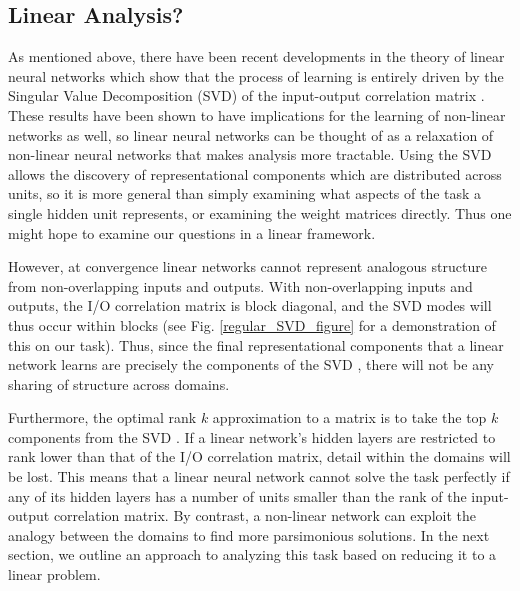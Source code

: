 \documentclass[10pt,letterpaper]{article}
\begin{document}
\subsection{Linear Analysis?}
As mentioned above, there have been recent developments in the theory of linear neural networks which show that the process of learning is entirely driven by the Singular Value Decomposition (SVD) of the input-output correlation matrix \citep{Saxe2013}. These results have been shown to have implications for the learning of non-linear networks as well, so linear neural networks can be thought of as a relaxation of non-linear neural networks that makes analysis more tractable. Using the SVD allows the discovery of representational components which are distributed across units, so it is more general than simply examining what aspects of the task a single hidden unit represents, or examining the weight matrices directly. Thus one might hope to examine our questions in a linear framework. \par
However, at convergence linear networks cannot represent analogous structure from non-overlapping inputs and outputs. With non-overlapping inputs and outputs, the I/O correlation matrix is block diagonal, and the SVD modes will thus occur within blocks (see Fig. \ref{regular_SVD_figure} for a demonstration of this on our task). Thus, since the final representational components that a linear network learns are precisely the components of the SVD \citep{Saxe2013}, there will not be any sharing of structure across domains.\par 
Furthermore, the optimal rank $k$ approximation to a matrix is to take the top $k$ components from the SVD \citep{Mirsky1960}. If a linear network's hidden layers are restricted to rank lower than that of the I/O correlation matrix, detail within the domains will be lost. This means that a linear neural network cannot solve the task perfectly if any of its hidden layers has a number of units smaller than the rank of the input-output correlation matrix. By contrast, a non-linear network can exploit the analogy between the domains to find more parsimonious solutions. In the next section, we outline an approach to analyzing this task based on reducing it to a linear problem.
\end{document}
